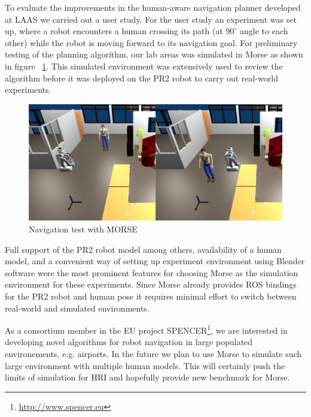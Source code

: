 \documentclass[conference]{IEEEtran}
\begin{document}
To evaluate the improvements in the human-aware navigation planner developed at
LAAS we carried out a user study. For the user study an experiment was set up,
where a robot encounters a human crossing its path (at $90^{\circ }$ angle to
each other) while the robot is moving forward to its navigation goal. For
preliminary testing of the planning algorithm, our lab areas was simulated in
Morse as shown in figure ~\ref{fig|hanp}. This simulated environment was
extensively used to review the algorithm before it was deployed on the PR2 robot
to carry out real-world
experiments. %

\begin{figure}[H]
      \centering
      \includegraphics[width=0.9\linewidth]{morsehanp.png}
      \caption{Navigation test with MORSE}
      \label{fig|hanp}
\end{figure}

Full support of the PR2 robot model among others, availability of a human model,
and a convenient way of setting up experiment environment using Blender software
were the most prominent features for choosing Morse as the simulation
environment for these experiments. Since Morse already provides ROS bindings for
the PR2 robot and human pose it requires minimal effort to switch between
real-world and simulated environments.

As a consortium member in the EU project
SPENCER\footnote{\url{http://www.spencer.eu}}, we are interested in developing
novel algorithms for robot navigation in large populated environements,
e.g. airports. In the future we plan to use Morse to simulate such large
environment with multiple human models. This will certainly push the limits of
simulation for HRI and hopefully provide new benchmark for Morse.
\end{document}
